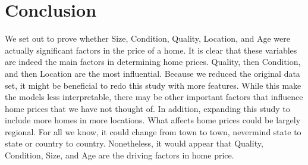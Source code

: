 \documentclass{article}
\begin{document}
	
	\section{Conclusion}

	We set out to prove whether Size, Condition, Quality, Location, and Age were actually significant factors in the price of a home. It is clear that these variables are indeed the main factors in determining home prices. Quality, then Condition, and then Location are the most influential. Because we reduced the original data set, it might be beneficial to redo this study with more features. While this make the models less interpretable, there may be other important factors that influence home prices that we have not thought of. In addition, expanding this study to include more homes in more locations. What affects home prices could be largely regional. For all we know, it could change from town to town, nevermind state to state or country to country. Nonetheless, it would appear that Quality, Condition, Size, and Age are the driving factors in home price. 
	
	
\end{document}
